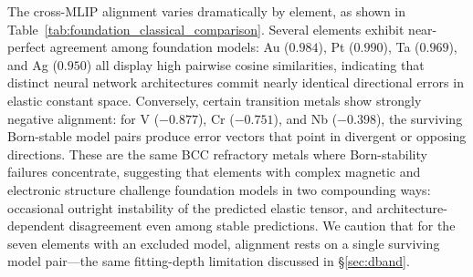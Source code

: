 The cross-MLIP alignment varies dramatically by element, as shown in Table~\ref{tab:foundation_classical_comparison}. Several elements exhibit near-perfect agreement among foundation models: Au ($0.984$), Pt ($0.990$), Ta ($0.969$), and Ag ($0.950$) all display high pairwise cosine similarities, indicating that distinct neural network architectures commit nearly identical directional errors in elastic constant space. Conversely, certain transition metals show strongly negative alignment: for V ($-0.877$), Cr ($-0.751$), and Nb ($-0.398$), the surviving Born-stable model pairs produce error vectors that point in divergent or opposing directions. These are the same BCC refractory metals where Born-stability failures concentrate, suggesting that elements with complex magnetic and electronic structure challenge foundation models in two compounding ways: occasional outright instability of the predicted elastic tensor, and architecture-dependent disagreement even among stable predictions. We caution that for the seven elements with an excluded model, alignment rests on a single surviving model pair---the same fitting-depth limitation discussed in \S\ref{sec:dband}.

